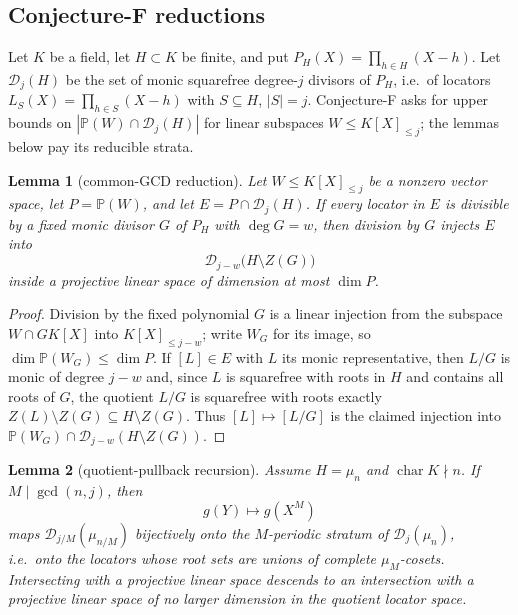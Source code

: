 \documentclass[11pt]{article}
\newtheorem{lemma}[lemma]{Lemma}
\theoremstyle{definition}
\theoremstyle{remark}
\providecommand{\Dloc}{\mathcal D}
\providecommand{\PP}{\mathbb P}
\begin{document}
\subsection{Conjecture-F reductions}

Let $K$ be a field, let $H\subset K$ be finite, and put $P_H(X)=\prod_{h\in H}(X-h)$.  Let $\Dloc_j(H)$ be the set of monic squarefree degree-$j$ divisors of $P_H$, i.e.\ of locators $L_S(X)=\prod_{h\in S}(X-h)$ with $S\subseteq H$, $|S|=j$.  Conjecture-F asks for upper bounds on $|\PP(W)\cap\Dloc_j(H)|$ for linear subspaces $W\le K[X]_{\le j}$; the lemmas below pay its reducible strata.

\begin{lemma}[common-GCD reduction]\label{lem:capf-gcd}
Let $W\le K[X]_{\le j}$ be a nonzero vector space, let $P=\PP(W)$, and let $E=P\cap\Dloc_j(H)$.  If every locator in $E$ is divisible by a fixed monic divisor $G$ of $P_H$ with $\deg G=w$, then division by $G$ injects $E$ into
\[
        \Dloc_{j-w}\bigl(H\setminus Z(G)\bigr)
\]
inside a projective linear space of dimension at most $\dim P$.
\end{lemma}

\begin{proof}
Division by the fixed polynomial $G$ is a linear injection from the subspace $W\cap GK[X]$ into $K[X]_{\le j-w}$; write $W_G$ for its image, so $\dim\PP(W_G)\le\dim P$.  If $[L]\in E$ with $L$ its monic representative, then $L/G$ is monic of degree $j-w$ and, since $L$ is squarefree with roots in $H$ and contains all roots of $G$, the quotient $L/G$ is squarefree with roots exactly $Z(L)\setminus Z(G)\subseteq H\setminus Z(G)$.  Thus $[L]\mapsto[L/G]$ is the claimed injection into $\PP(W_G)\cap\Dloc_{j-w}(H\setminus Z(G))$.
\end{proof}

\begin{lemma}[quotient-pullback recursion]\label{lem:capf-quot-pullback}
Assume $H=\mu_n$ and $\operatorname{char}K\nmid n$.  If $M\mid\gcd(n,j)$, then
\[
        g(Y)\longmapsto g(X^M)
\]
maps $\Dloc_{j/M}(\mu_{n/M})$ bijectively onto the $M$-periodic stratum of $\Dloc_j(\mu_n)$, i.e.\ onto the locators whose root sets are unions of complete $\mu_M$-cosets.  Intersecting with a projective linear space descends to an intersection with a projective linear space of no larger dimension in the quotient locator space.
\end{lemma}
\end{document}
